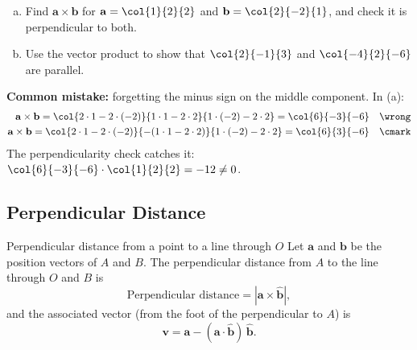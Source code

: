 \begin{example}[label=ex:3.1]
\begin{enumerate}[(a)]
  \item Find $\mathbf{a}\times\mathbf{b}$ for $\mathbf{a} = \col{1}{2}{2}$ and $\mathbf{b} = \col{2}{-2}{1}$, and check it is perpendicular to both.
  \item Use the vector product to show that $\col{2}{-1}{3}$ and $\col{-4}{2}{-6}$ are parallel.
\end{enumerate}
\end{example}

\begin{mistake}
\textbf{Common mistake:} forgetting the minus sign on the middle component. In (a):
\begin{align*}
\mathbf{a}\times\mathbf{b} = \col{2\cdot 1 - 2\cdot(-2)}{1\cdot 1 - 2\cdot 2}{1\cdot(-2) - 2\cdot 2} = \col{6}{-3}{-6} & & \wrong \\
\mathbf{a}\times\mathbf{b} = \col{2\cdot 1 - 2\cdot(-2)}{-(1\cdot 1 - 2\cdot 2)}{1\cdot(-2) - 2\cdot 2} = \col{6}{3}{-6} & & \cmark
\end{align*}
The perpendicularity check catches it: $\col{6}{-3}{-6}\cdot\col{1}{2}{2} = -12 \neq 0$.
\end{mistake}

\clearpage
\subsection{Perpendicular Distance}
\begin{definition}{Perpendicular distance from a point to a line through $O$}
Let $\mathbf{a}$ and $\mathbf{b}$ be the position vectors of $A$ and $B$. The perpendicular distance from $A$ to the line through $O$ and $B$ is
\[
\text{Perpendicular distance} = |\mathbf{a}\times\hat{\mathbf{b}}|,
\]
and the associated vector (from the foot of the perpendicular to $A$) is
\[
\mathbf{v} = \mathbf{a} - (\mathbf{a}\cdot\hat{\mathbf{b}})\,\hat{\mathbf{b}}.
\]
\end{definition}

